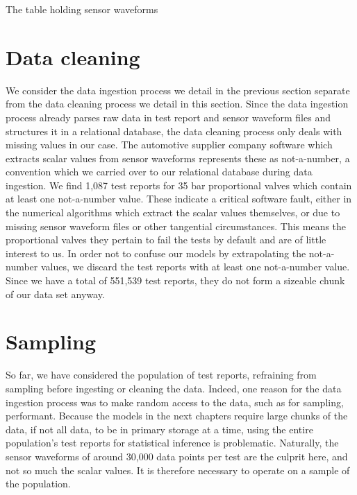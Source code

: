 \begin{listing}
  \inputminted[firstline=254,lastline=310,breaklines=true]{postgresql}{schema.sql}
  \caption{The table holding sensor waveforms}
  \label{lst:waveform-value}
\end{listing}

\section{Data cleaning}

We consider the data ingestion process we detail in the previous section separate from the data cleaning process we detail in this section.
Since the data ingestion process already parses raw data in test report and sensor waveform files and structures it in a relational database, the data cleaning process only deals with missing values in our case.
The automotive supplier company software which extracts scalar values from sensor waveforms represents these as not-a-number, a convention which we carried over to our relational database during data ingestion.
We find 1,087 test reports for 35 bar proportional valves which contain at least one not-a-number value.
These indicate a critical software fault, either in the numerical algorithms which extract the scalar values themselves, or due to missing sensor waveform files or other tangential circumstances.
This means the proportional valves they pertain to fail the tests by default and are of little interest to us.
In order not to confuse our models by extrapolating the not-a-number values, we discard the test reports with at least one not-a-number value.
Since we have a total of 551,539 test reports, they do not form a sizeable chunk of our data set anyway.

\section{Sampling}

So far, we have considered the population of test reports, refraining from sampling before ingesting or cleaning the data.
Indeed, one reason for the data ingestion process was to make random access to the data, such as for sampling, performant.
Because the models in the next chapters require large chunks of the data, if not all data, to be in primary storage at a time, using the entire population's test reports for statistical inference is problematic.
Naturally, the sensor waveforms of around 30,000 data points per test are the culprit here, and not so much the scalar values.
It is therefore necessary to operate on a sample of the population.

